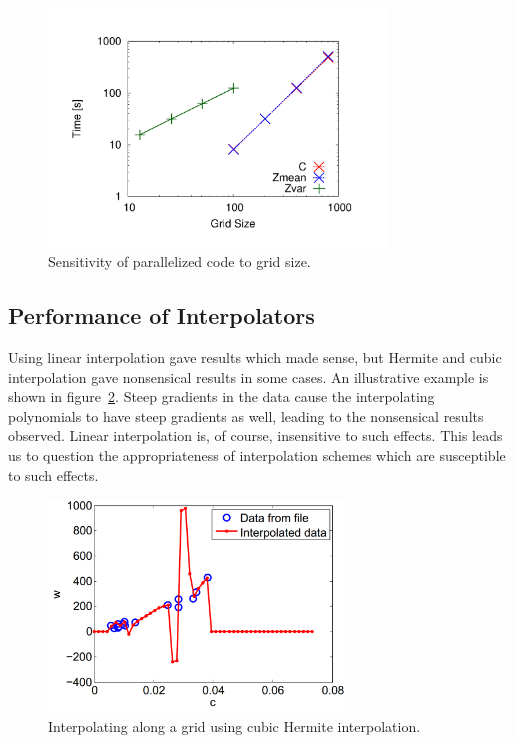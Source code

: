 \documentclass[11pt]{article}
\begin{document}
\begin{figure} [h]
\centering
\includegraphics[width=0.8\textwidth]{plot_gridsizes}
\caption{\label{fig:gridsensitivity} Sensitivity of parallelized code to grid size.}
\end{figure}

\subsection{Performance of Interpolators}
Using linear interpolation gave results which made sense, but Hermite and cubic interpolation gave nonsensical results in some cases. An illustrative example is shown in figure~\ref{fig:interpolator}. Steep gradients in the data cause the interpolating polynomials to have steep gradients as well, leading to the nonsensical results observed. Linear interpolation is, of course, insensitive to such effects. This leads us to question the appropriateness of interpolation schemes which are susceptible to such effects.

\begin{figure} [h]
\centering
\includegraphics[width=0.7\textwidth]{interpolator}
\caption{\label{fig:interpolator} Interpolating along a grid using cubic Hermite interpolation.}
\end{figure}
\end{document}
